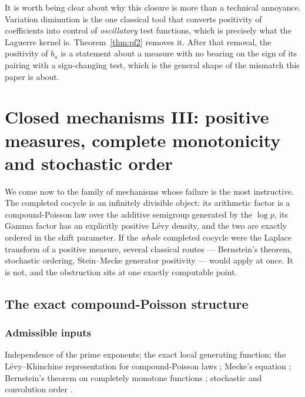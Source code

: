 \documentclass[11pt]{amsart}
\theoremstyle{definition}
\theoremstyle{remark}
\theoremstyle{definition}
\begin{document}
\noindent It is worth being clear about why this closure is more than a technical annoyance.
Variation diminution is the one classical tool that converts positivity of coefficients into
control of \emph{oscillatory} test functions, which is precisely what the Laguerre kernel is.
Theorem~\ref{thm:pf2} removes it. After that removal, the positivity of $b_u$ is a statement
about a measure with no bearing on the sign of its pairing with a sign-changing test, which is
the general shape of the mismatch this paper is about.

\section{Closed mechanisms III: positive measures, complete monotonicity and stochastic order}
\label{sec:mech-measure}

We come now to the family of mechanisms whose failure is the most instructive. The completed cocycle is an infinitely divisible object: its
arithmetic factor is a compound-Poisson law over the additive semigroup generated by the
$\log p$, its Gamma factor has an explicitly positive L\'evy density, and the two are exactly
ordered in the shift parameter. If the \emph{whole} completed cocycle were the Laplace transform
of a positive measure, several classical routes --- Bernstein's theorem, stochastic ordering,
Stein--Mecke generator positivity --- would apply at once. It is not, and the obstruction sits at
one exactly computable point.

\subsection{The exact compound-Poisson structure}\label{sec:cp}

\subsubsection*{Admissible inputs}
Independence of the prime exponents; the exact local generating function; the L\'evy--Khinchine
representation for compound-Poisson laws \cite{Sato,SteutelVanHarn}; Mecke's equation
\cite{LastPenrose}; Bernstein's theorem on completely monotone functions \cite{Widder,SSV};
stochastic and convolution order \cite{ShakedShanthikumar}.
\end{document}

